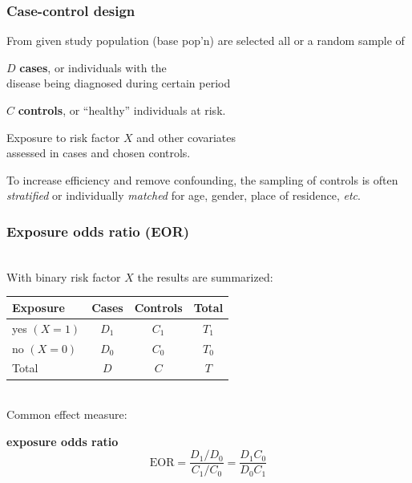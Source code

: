 \documentclass[handout,12pt]{beamer}
\begin{document}
\begin{frame} \frametitle{Case-control design}

\bi
\item
From given study  population (base pop'n) are selected 
all or a random sample of
\bi
{\normalsize
\item $D$ {\bf cases}, or individuals with the \\
  disease being diagnosed during certain period
\medskip
\item $C$ {\bf controls}, or ``healthy'' individuals at risk.
}
\ei
\item
Exposure to risk factor $X$ and other covariates \\
  assessed in cases and chosen controls.
 \medskip
 \item
 To increase efficiency and remove confounding,
the sampling of controls is often {\it stratified} or individually {\it matched} for age, gender,
place of residence, {\it etc}.
 \ei
\end{frame} 
\begin{frame} 
\frametitle{Exposure odds ratio (EOR)}
\ \\
With binary risk factor $X$ the results are summarized:

\begin{center}
\begin{tabular}{lccc}
\toprule
Exposure         &        Cases        &    Controls & Total\\
\midrule
yes $(X=1)$        &        $D_{1}$ &        $C_{1}$  & $T_1$  \\
no $(X=0)$         &        $D_{0}$  &        $C_{0}$  & $T_0$  \\
\midrule  
Total        &                $D $  &  $C$  & $T $ \\
\bottomrule
\end{tabular}
\end{center}

\ \\
Common effect measure:
\bi
\item {\bf exposure odds ratio}
      $$  \text{EOR}  
          =  \frac{ D_{1} / D_{0} } { C_{1} / C_{0} }  
          = \frac{ D_{1} C_{0} } { D_{0} C_{1} }        
      $$
\ei
\end{frame} 


 
\end{document}
